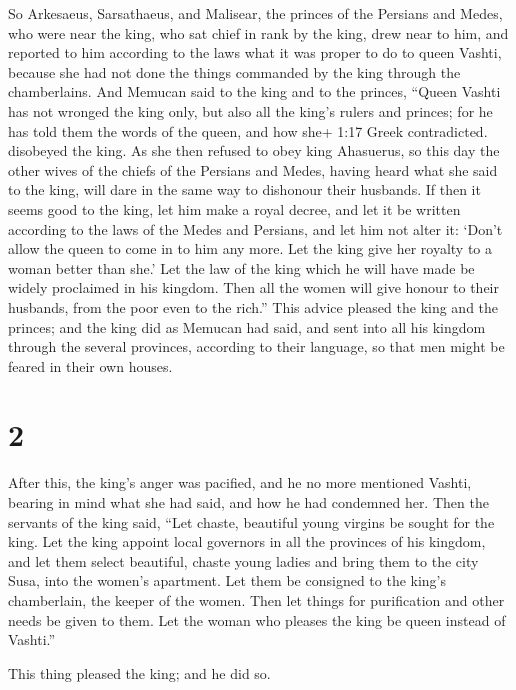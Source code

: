  So Arkesaeus, Sarsathaeus, and Malisear, the princes of
the Persians and Medes, who were near the king, who sat chief in rank by
the king, drew near to him,  and reported to him according
to the laws what it was proper to do to queen Vashti, because she had
not done the things commanded by the king through the chamberlains.
 And Memucan said to the king and to the princes, ``Queen
Vashti has not wronged the king only, but also all the king's rulers and
princes;  for he has told them the words of the queen, and
how she+ 1:17 Greek contradicted. disobeyed the king. As she then
refused to obey king Ahasuerus,  so this day the other
wives of the chiefs of the Persians and Medes, having heard what she
said to the king, will dare in the same way to dishonour their husbands.
 If then it seems good to the king, let him make a royal
decree, and let it be written according to the laws of the Medes and
Persians, and let him not alter it: `Don't allow the queen to come in to
him any more. Let the king give her royalty to a woman better than she.'
 Let the law of the king which he will have made be widely
proclaimed in his kingdom. Then all the women will give honour to their
husbands, from the poor even to the rich.''  This advice
pleased the king and the princes; and the king did as Memucan had said,
 and sent into all his kingdom through the several
provinces, according to their language, so that men might be feared in
their own houses.

\hypertarget{section-1}{%
\section{2}\label{section-1}}

 After this, the king's anger was pacified, and he no more
mentioned Vashti, bearing in mind what she had said, and how he had
condemned her.  Then the servants of the king said, ``Let
chaste, beautiful young virgins be sought for the king.  Let
the king appoint local governors in all the provinces of his kingdom,
and let them select beautiful, chaste young ladies and bring them to the
city Susa, into the women's apartment. Let them be consigned to the
king's chamberlain, the keeper of the women. Then let things for
purification and other needs be given to them.  Let the
woman who pleases the king be queen instead of Vashti.''

This thing pleased the king; and he did so.

